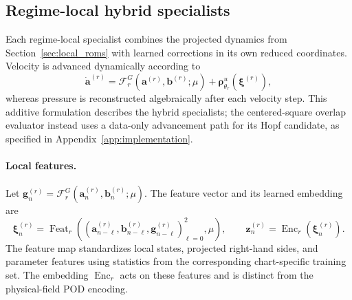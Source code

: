 \subsection{Regime-local hybrid specialists}
\label{sec:hybrid_specialists}

Each regime-local specialist combines the projected dynamics from
Section~\ref{sec:local_roms} with learned corrections in its own reduced
coordinates. Velocity is advanced dynamically according to
\begin{equation}
  \dot{\bm a}^{(r)}
  =\mathcal F_r^G(\bm a^{(r)},\bm b^{(r)};\mu)
  +\bm\rho^u_{\theta_r}(\bm\xi^{(r)}),
  \label{eq:main_specialist}
\end{equation}
whereas pressure is reconstructed algebraically after each velocity step.
This additive formulation describes the hybrid specialists; the
centered-square overlap evaluator instead uses a data-only advancement
path for its Hopf candidate, as specified in
Appendix~\ref{app:implementation}.

\paragraph{Local features.}
Let $\bm g_n^{(r)}=\mathcal F_r^G(\bm a_n^{(r)},\bm b_n^{(r)};\mu)$.
The feature vector and its learned embedding are
\begin{equation}
  \bm\xi_n^{(r)}
  =\operatorname{Feat}_r\!\left(
    (\bm a_{n-\ell}^{(r)},\bm b_{n-\ell}^{(r)},
     \bm g_{n-\ell}^{(r)})_{\ell=0}^{2},\mu\right),
  \qquad
  \bm z_n^{(r)}=\operatorname{Enc}_r(\bm\xi_n^{(r)}).
  \label{eq:main_specialist_features}
\end{equation}
The feature map standardizes local states, projected right-hand sides,
and parameter features using statistics from the corresponding
chart-specific training set. The embedding $\operatorname{Enc}_r$ acts
on these features and is distinct from the physical-field POD encoding.

